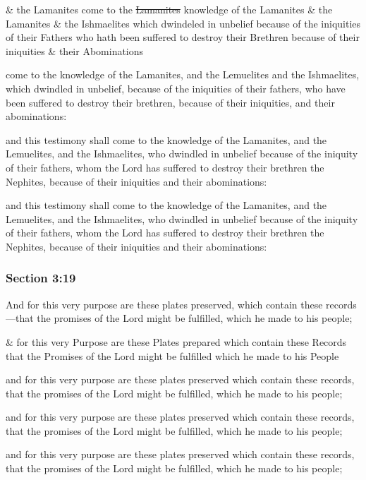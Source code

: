 		\begin{framed}
		\scriptsize
			\begin{compactdesc}
				\item[JSP] \& the Lamanites come to the \sout{Lamanites} knowledge of the Lamanites \& the Lamanites \& the Ishmaelites which dwindeled in unbelief because of the iniquities of their Fathers who hath been suffered to destroy their Brethren because of their iniquities \& their Abominations
				\item[BC] come to the knowledge of the Lamanites, and the Lemuelites and the Ishmaelites, which dwindled in unbelief, because of the iniquities of their fathers, who have been suffered to destroy their brethren, because of their iniquities, and their abominations: 
				\item[DC 1835] and this testimony shall come to the knowledge of the Lamanites, and the Lemuelites, and the Ishmaelites, who dwindled in unbelief because of the iniquity of their fathers, whom the Lord has suffered to destroy their brethren the Nephites, because of their iniquities and their abominations:
				\item[DC 1844] and this testimony shall come to the knowledge of the Lamanites, and the Lemuelites, and the Ishmaelites, who dwindled in unbelief because of the iniquity of their fathers, whom the Lord has suffered to destroy their brethren the Nephites, because of their iniquities and their abominations:
			\end{compactdesc}
		\end{framed}

	\subsubsection{Section 3:19} %
		\label{DC3-19}

		And for this very purpose are these plates preserved, which contain these records---that the promises of the Lord might be fulfilled, which he made to his people;

		\begin{framed}
		\scriptsize
			\begin{compactdesc}
				\item[JSP] \& for this very Purpose are these Plates prepared which contain these Records that the Promises of the Lord might be fulfilled which he made to his People
				\item[BC] and for this very purpose are these plates preserved which contain these records, that the promises of the Lord might be fulfilled, which he made to his people; 
				\item[DC 1835] and for this very purpose are these plates preserved which contain these records, that the promises of the Lord might be fulfilled, which he made to his people;
				\item[DC 1844] and for this very purpose are these plates preserved which contain these records, that the promises of the Lord might be fulfilled, which he made to his people;
			\end{compactdesc}
		\end{framed}

